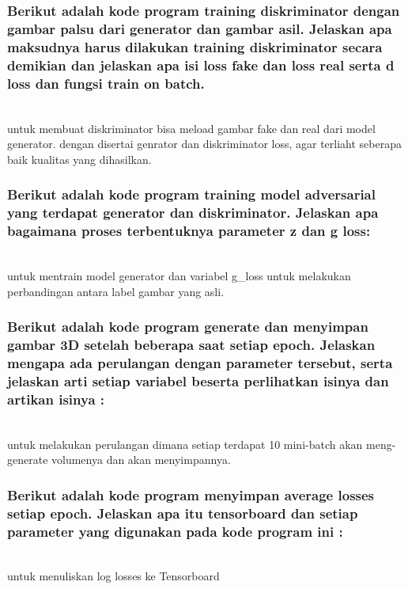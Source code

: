 \subsubsection{Berikut adalah kode program training diskriminator dengan gambar palsu dari generator dan gambar asil. Jelaskan apa maksudnya harus dilakukan training diskriminator secara demikian dan jelaskan apa isi loss fake dan loss real serta d loss dan fungsi train on batch.}
\hfill\\

untuk membuat diskriminator bisa meload gambar fake dan real dari model generator. dengan disertai genrator dan diskriminator loss, agar terliaht seberapa baik kualitas yang dihasilkan.


\subsubsection{Berikut adalah kode program training model adversarial yang terdapat generator dan diskriminator. Jelaskan apa bagaimana proses terbentuknya parameter z dan g loss:}
\hfill\\

untuk mentrain model generator dan variabel g\_loss untuk melakukan perbandingan antara label gambar yang asli.

\subsubsection{Berikut adalah kode program generate dan menyimpan gambar 3D setelah beberapa saat setiap epoch. Jelaskan mengapa ada perulangan dengan parameter tersebut, serta jelaskan arti setiap variabel beserta perlihatkan isinya dan artikan isinya :}
\hfill\\

untuk melakukan perulangan dimana setiap terdapat 10 mini-batch akan meng-generate volumenya dan akan menyimpannya.


\subsubsection{Berikut adalah kode program menyimpan average losses setiap epoch. Jelaskan apa itu tensorboard dan setiap parameter yang digunakan pada kode program ini :}
\hfill\\

untuk menuliskan log losses ke Tensorboard

